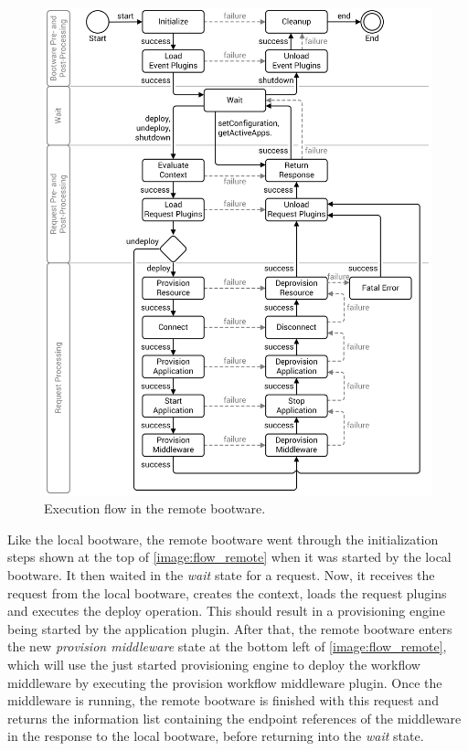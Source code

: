 \begin{figure}[!htbp]
	\centering
	\includegraphics[resolution=600]{design/assets/flow_remote}
	\caption{Execution flow in the remote bootware.}
	\label{image:flow_remote}
\end{figure}

Like the local bootware, the remote bootware went through the initialization steps shown at the top of \autoref{image:flow_remote} when it was started by the local bootware.
It then waited in the \textit{wait} state for a request.
Now, it receives the request from the local bootware, creates the context, loads the request plugins and executes the deploy operation.
This should result in a provisioning engine being started by the application plugin.
After that, the remote bootware enters the new \textit{provision middleware} state at the bottom left of \autoref{image:flow_remote}, which will use the just started provisioning engine to deploy the workflow middleware by executing the provision workflow middleware plugin.
Once the middleware is running, the remote bootware is finished with this request and returns the information list containing the endpoint references of the middleware in the response to the local bootware, before returning into the \textit{wait} state.

